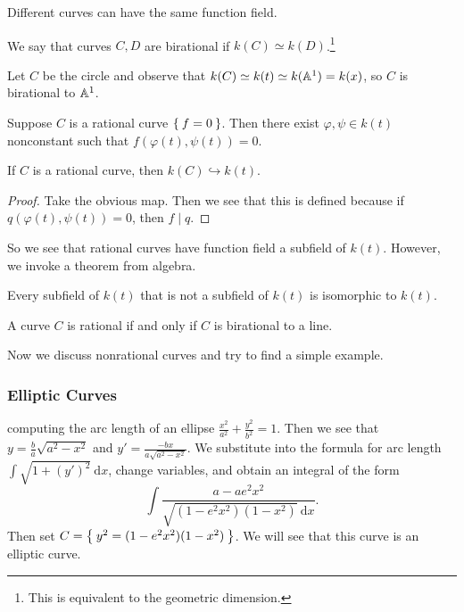 \documentclass[twoside, 10pt]{article}
\renewcommand{\d}{\ \mathrm{d}}
\begin{document}
    \begin{rmk} Different curves can have the same function field.  \end{rmk}

    \begin{defn} We say that curves $C,D$ are birational if $k(C) \simeq
    k(D)$.\footnote{This is equivalent to the geometric dimension.} \end{defn}

    \begin{exm} Let $C$ be the circle and observe that $k(C) \simeq k(t) \simeq
    k(\mathbb{A}^1) = k(x)$, so $C$ is birational to $\mathbb{A}^1$.  \end{exm}

    Suppose $C$ is a rational curve $\Set{f=0}$. Then there exist $\varphi,
    \psi \in k(t)$ nonconstant such that $f(\varphi(t), \psi(t)) = 0$.

    \begin{lem} If $C$ is a rational curve, then $k(C) \hookrightarrow k(t)$.
        \begin{proof} Take the obvious map. Then we see that this is defined
        because if $q(\varphi(t), \psi(t)) = 0$, then $f \mid q$.  \end{proof}
    \end{lem}

    So we see that rational curves have function field a subfield of $k(t)$.
    However, we invoke a theorem from algebra.

    \begin{thm}[L\"uroth] Every subfield of $k(t)$ that is not a subfield of
    $k(t)$ is isomorphic to $k(t)$.  \end{thm}

    \begin{cor} A curve $C$ is rational if and only if $C$ is birational to a
    line.  \end{cor}

    Now we discuss nonrational curves and try to find a simple example.

    \subsubsection{Elliptic Curves}%
    computing the arc length of an ellipse $\frac{x^2}{a^2} + \frac{y^2}{b^2} =
    1$. Then we see that $y = \frac{b}{a} \sqrt{a^2-x^2}$ and $y' =
    \frac{-bx}{a\sqrt{a^2-x^2}}$. We substitute into the formula for arc length
    $\int \sqrt{1+(y')^2} \d x$, change variables, and obtain an integral of
    the form \[ \int \frac{a-ae^2x^2}{\sqrt{(1-e^2x^2)(1-x^2)} \d x}. \] Then
    set $C = \Set{y^2 = (1-e^2x^2)(1-x^2)}$. We will see that this curve is an
    elliptic curve.
\end{document}
